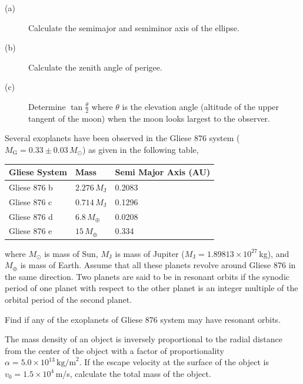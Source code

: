 \begin{description}
\item[(a)] Calculate the semimajor and semiminor axis of the ellipse.
\item[(b)] Calculate the zenith angle of perigee.
\item[(c)] Determine $\tan\frac{\theta}{2}$ where $\theta$ is the elevation
  angle (altitude of the upper tangent of the moon) when the moon looks
  largest to the observer.
\end{description}

Several exoplanets have been observed in the Gliese 876 system
($M_{\mathrm{G}} = 0.33 \pm 0.03\,M_\odot$) as given in the following table,

\begin{center}
\begin{tabular}{|l|l|l|}
\hline
\textbf{Gliese System} & \textbf{Mass} & \textbf{Semi Major Axis (AU)} \\
\hline
Gliese 876 b & $2.276\,M_{\mathrm{J}}$ & 0.2083 \\
\hline
Gliese 876 c & $0.714\,M_{\mathrm{J}}$ & 0.1296 \\
\hline
Gliese 876 d & $6.8\,M_\oplus$ & 0.0208 \\
\hline
Gliese 876 e & $15\,M_\oplus$ & 0.334 \\
\hline
\end{tabular}
\end{center}

where $M_\odot$ is mass of Sun, $M_{\mathrm{J}}$ is mass of Jupiter
($M_{\mathrm{J}} = 1.89813 \times 10^{27}$\,kg), and $M_\oplus$ is mass of
Earth. Assume that all these planets revolve around Gliese 876 in the same
direction. Two planets are said to be in resonant orbits if the synodic period
of one planet with respect to the other planet is an integer multiple of the
orbital period of the second planet.

Find if any of the exoplanets of Gliese 876 system may have resonant orbits.

The mass density of an object is inversely proportional to the radial distance
from the center of the object with a factor of proportionality
$\alpha = 5.0 \times 10^{13}\,\mathrm{kg/m}^2$. If the escape velocity at the
surface of the object is $v_0 = 1.5 \times 10^4$\,m/s, calculate the total
mass of the object.

